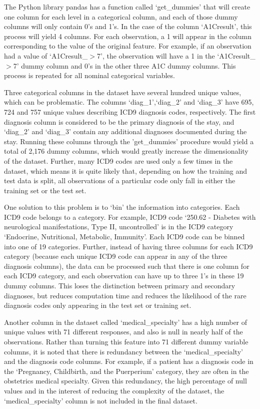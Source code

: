 \documentclass[sigconf]{acmart}
\begin{document}
The Python library pandas has a function called `get\_dummies' that will create one column for each level in a categorical column, and each of those dummy columns will only contain 0's and 1's. In the case of the column `A1Cresult', this process will yield 4 columns. For each observation, a 1 will appear in the column corresponding to the value of the original feature. For example, if an observation had a value of `A1Cresult\_$>$7', the observation will have a 1 in the `A1Cresult\_$>$7' dummy column and 0's in the other three A1C dummy columns. This process is repeated for all nominal categorical variables.

Three categorical columns in the dataset have several hundred unique values, which can be problematic. The columns `diag\_1',`diag\_2' and `diag\_3' have 695, 724 and 757 unique values describing ICD9 diagnosis codes, respectively. The first diagnosis column is considered to be the primary diagnosis of the stay, and `diag\_2' and `diag\_3' contain any additional diagnoses documented during the stay. Running these columns through the 'get\_dummies' procedure would yield a total of 2,176 dummy columns, which would greatly increase the dimensionality of the dataset. Further, many ICD9 codes are used only a few times in the dataset, which means it is quite likely that, depending on how the training and test data is split, all observations of a particular code only fall in either the training set or the test set.

One solution to this problem is to `bin' the information into categories. Each ICD9 code belongs to a category. For example, ICD9 code `250.62 - Diabetes with neurological manifestations, Type II, uncontrolled' is in the ICD9 category `Endocrine, Nutritional, Metabolic, Immunity'. Each ICD9 code can be binned into one of 19 categories. Further, instead of having three columns for each ICD9 category (because each unique ICD9 code can appear in any of the three diagnosis columns), the data can be processed such that there is one column for each ICD9 category, and each observation can have up to three 1's in these 19 dummy columns. This loses the distinction between primary and secondary diagnoses, but reduces computation time and reduces the likelihood of the rare diagnosis codes only appearing in the test set or training set.

Another column in the dataset called `medical\_specialty' has a high number of unique values with 71 different responses, and also is null in nearly half of the observations. Rather than turning this feature into 71 different dummy variable columns, it is noted that there is redundancy between the `medical\_specialty' and the diagnosis code columns. For example, if a patient has a diagnosis code in the `Pregnancy, Childbirth, and the Puerperium' category, they are often in the obstetrics medical specialty. Given this redundancy, the high percentage of null values and in the interest of reducing the complexity of the dataset, the `medical\_specialty' column is not included in the final dataset.
\end{document}
